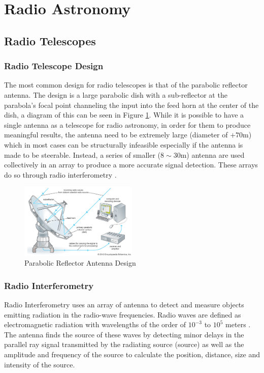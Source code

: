 \section{Radio Astronomy}\label{ra}
\subsection{Radio Telescopes}\label{ra:sec:rt}
%
\subsubsection{Radio Telescope Design}
The most common design for radio telescopes is that of the parabolic reflector antenna. The design is a large parabolic dish with a sub-reflector at the parabola's focal point channeling the input into the feed horn at the center of the dish, a diagram of this can be seen in Figure \ref{ra:fig:para}. While it is possible to have a single antenna as a telescope for radio astronomy, in order for them to produce meaningful results, the antenna need to be extremely large (diameter of $+70$m) which in most cases can be structurally infeasible especially if the antenna is made to be steerable. Instead, a series of smaller ($8\sim30$m) antenna are used collectively in an array to produce a more accurate signal detection. These arrays do so through radio interferometry \citep{cheng2009radio}.
%
\begin{figure}[H]
	\centering
	\includegraphics[width=0.5\textwidth]{Images/Telescope.jpg}
	\caption{Parabolic Reflector Antenna Design \citep{telescope}}
	\label{ra:fig:para}
\end{figure}
%
\subsubsection{Radio Interferometry}\label{ra:ssec:des}
Radio Interferometry uses an array of antenna to detect and measure objects emitting radiation in the radio-wave frequencies. Radio waves are defined as electromagnetic radiation with wavelengths of the order of $10^{-3}$ to $10^5$ meters \citep{cheng2009radio}. The antenna finds the source of these waves by detecting minor delays in the parallel ray signal transmitted by the radiating source (source) as well as the amplitude and frequency of the source to calculate the position, distance, size and intensity of the source\citep{thompson2008interferometry}.
%
